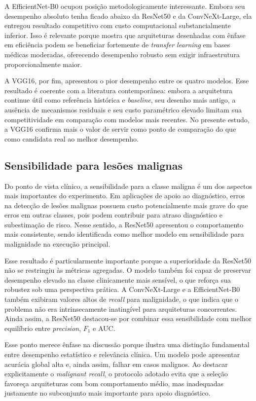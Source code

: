 \documentclass[tcc,capa]{texufpel}
\begin{document}
A EfficientNet-B0 ocupou posição metodologicamente interessante. Embora seu desempenho absoluto tenha ficado abaixo da ResNet50 e da ConvNeXt-Large, ela entregou resultado competitivo com custo computacional substancialmente inferior. Isso é relevante porque mostra que arquiteturas desenhadas com ênfase em eficiência podem se beneficiar fortemente de \textit{transfer learning} em bases médicas moderadas, oferecendo desempenho robusto sem exigir infraestrutura proporcionalmente maior.

A VGG16, por fim, apresentou o pior desempenho entre os quatro modelos. Esse resultado é coerente com a literatura contemporânea: embora a arquitetura continue útil como referência histórica e \textit{baseline}, seu desenho mais antigo, a ausência de mecanismos residuais e seu custo paramétrico elevado limitam sua competitividade em comparação com modelos mais recentes. No presente estudo, a VGG16 confirma mais o valor de servir como ponto de comparação do que como candidata real ao melhor desempenho.

\subsection{Sensibilidade para lesões malignas}

Do ponto de vista clínico, a sensibilidade para a classe maligna é um dos aspectos mais importantes do experimento. Em aplicações de apoio ao diagnóstico, erros na detecção de lesões malignas possuem custo potencialmente mais grave do que erros em outras classes, pois podem contribuir para atraso diagnóstico e subestimação de risco. Nesse sentido, a ResNet50 apresentou o comportamento mais consistente, sendo identificada como melhor modelo em sensibilidade para malignidade na execução principal.

Esse resultado é particularmente importante porque a superioridade da ResNet50 não se restringiu às métricas agregadas. O modelo também foi capaz de preservar desempenho elevado na classe clinicamente mais sensível, o que reforça sua robustez sob uma perspectiva prática. A ConvNeXt-Large e a EfficientNet-B0 também exibiram valores altos de \textit{recall} para malignidade, o que indica que o problema não era intrinsecamente inatingível para arquiteturas concorrentes. Ainda assim, a ResNet50 destacou-se por combinar essa sensibilidade com melhor equilíbrio entre \textit{precision}, \(F_1\) e AUC.

Esse ponto merece ênfase na discussão porque ilustra uma distinção fundamental entre desempenho estatístico e relevância clínica. Um modelo pode apresentar acurácia global alta e, ainda assim, falhar em casos malignos. Ao destacar explicitamente o \textit{malignant recall}, o protocolo adotado evita que a seleção favoreça arquiteturas com bom comportamento médio, mas inadequadas justamente no subconjunto mais importante para apoio diagnóstico.
\end{document}

